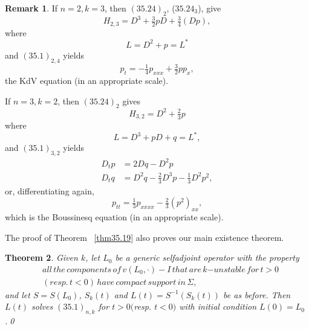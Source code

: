 \documentclass{surv-l}
\theoremstyle{plain}
\newtheorem{theorem}{Theorem}[section]
\theoremstyle{definition}
\newtheorem{remark}[theorem]{Remark}
\numberwithin{equation}{chapter}
\begin{document}
\begin{remark}\label{rem35.31}
If $n=2, k=3$, then $(35.24)_{2}$, ($35.24_{3}$), give
\begin{equation*}
H_{2,3}=D^{3}+\tfrac{3}{2}pD+\tfrac{3}{4}(Dp),
\end{equation*}
where
\begin{equation*}
L=D^{2}+p=L^{*}
\end{equation*}
and $(35.1)_{2,4}$ yields
\begin{equation*}
p_{t}=-\tfrac{1}{4}p_{xxx}+\tfrac{3}{2}pp_{x},
\end{equation*}
the KdV equation (in an appropriate scale).
\end{remark}

If $n=3, k=2$, then $(35.24)_{2}$ gives
\begin{equation*}
H_{3,2}=D^{2}+\tfrac{2}{3}p
\end{equation*}
where
\begin{equation*}
L=D^{3}+pD+q=L^{*},
\end{equation*}
and $(35.1)_{3,2}$ yields
\begin{align*}
D_{t}p&=2Dq-D^{2}p\\
D_{t}q&=D^{2}q-\tfrac{2}{3}D^{3}p-\tfrac{1}{3}D^{2}p^{2},
\end{align*}
or, differentiating again,
\begin{equation*}
p_{tt}=\tfrac{1}{3}p_{xxxx}-\tfrac{2}{3}(p^{2})_{xx},
\end{equation*}
which is the Boussinesq equation (in an appropriate scale).

The proof of Theorem ~\ref{thm35.19} also proves our main existence theorem.

\begin{theorem}\label{thm35.31}
Given $k$, let $L_{0}$ be a generic selfadjoint operator with the property
\setcounter{equation}{31}
\begin{align}\label{eq35.32}
&all\, the\, components\, of\, v(L_{0}, \cdot)-I\, that\, are\, k\mathrm{-}unstable\, for\, t>0\\
&(resp.\, t<0)\, have\, compact\, support\, in\, \Sigma,\nonumber
\end{align}
and let $S=S(L_{0})$, $S_{k}(t)$ and $L(t)=S^{-1}(S_{k}(t))$ be as before. Then $L(t)$ solves $(35.1)_{n,k}$ for $t>0 ($resp. $t<0)$ with initial condition $L(0)=L_{0}$.\qed
\end{theorem}
\end{document}

